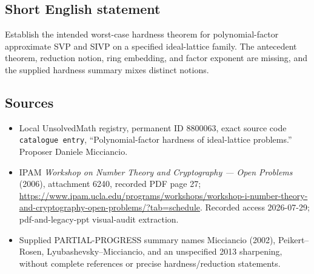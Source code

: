 \documentclass[11pt]{article}
\begin{document}
\subsection{Short English statement}
Establish the intended worst-case hardness theorem for polynomial-factor approximate SVP and SIVP on a specified ideal-lattice family. The antecedent theorem, reduction notion, ring embedding, and factor exponent are missing, and the supplied hardness summary mixes distinct notions.
\subsection{Sources}
\begin{itemize}
\item Local UnsolvedMath registry, permanent ID \(8800063\), exact source code \texttt{catalogue entry}, ``Polynomial-factor hardness of ideal-lattice problems.'' Proposer Daniele Micciancio.
\item IPAM \emph{Workshop on Number Theory and Cryptography --- Open Problems} (2006), attachment 6240, recorded PDF page 27; \url{https://www.ipam.ucla.edu/programs/workshops/workshop-i-number-theory-and-cryptography-open-problems/?tab=schedule}. Recorded access 2026-07-29; pdf-and-legacy-ppt visual-audit extraction.
\item Supplied PARTIAL-PROGRESS summary names Micciancio (2002), Peikert--Rosen, Lyubashevsky--Micciancio, and an unspecified 2013 sharpening, without complete references or precise hardness/reduction statements.
\end{itemize}
\end{document}
